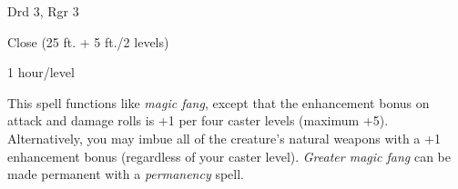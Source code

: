 
\begin{description*}
\item[Level:] Drd 3, Rgr 3
\item[Range:] Close (25 ft. + 5 ft./2 levels)
\item[Duration:] 1 hour/level
\end{description*}

This spell functions like \textit{magic fang}, except that the enhancement bonus
on attack and damage rolls is +1 per four caster levels (maximum +5).
Alternatively, you may imbue all of the creature's natural weapons with a +1 enhancement
bonus (regardless of your caster level).
\textit{Greater magic fang} can be made permanent with a \textit{permanency} spell.